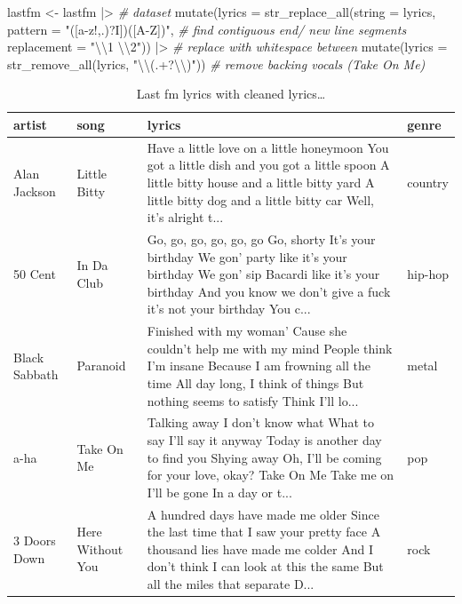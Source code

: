 \documentclass[
  letterpaper,
]{scrbook}
\newenvironment{Shaded}{\begin{snugshade}}{\end{snugshade}}
\newcommand{\AttributeTok}[1]{\textcolor[rgb]{0.00,0.00,0.00}{#1}}
\newcommand{\CommentTok}[1]{\textcolor[rgb]{0.00,0.00,0.00}{\textit{#1}}}
\newcommand{\FunctionTok}[1]{\textcolor[rgb]{0.00,0.00,0.00}{#1}}
\newcommand{\NormalTok}[1]{\textcolor[rgb]{0.00,0.00,0.00}{#1}}
\newcommand{\OtherTok}[1]{\textcolor[rgb]{0.00,0.00,0.00}{#1}}
\newcommand{\SpecialCharTok}[1]{\textcolor[rgb]{0.00,0.00,0.00}{#1}}
\newcommand{\StringTok}[1]{\textcolor[rgb]{0.00,0.00,0.00}{#1}}
\begin{document}
\begin{Shaded}
\begin{Highlighting}[]
\NormalTok{lastfm }\OtherTok{\textless{}{-}} 
\NormalTok{  lastfm }\SpecialCharTok{|\textgreater{}} \CommentTok{\# dataset}
  \FunctionTok{mutate}\NormalTok{(}\AttributeTok{lyrics =} 
           \FunctionTok{str\_replace\_all}\NormalTok{(}\AttributeTok{string =}\NormalTok{ lyrics, }
                           \AttributeTok{pattern =} \StringTok{"([a{-}z\textquotesingle{}!,.)?I])([A{-}Z])"}\NormalTok{, }\CommentTok{\# find contiguous end/ new line segments}
                           \AttributeTok{replacement =} \StringTok{"}\SpecialCharTok{\textbackslash{}\textbackslash{}}\StringTok{1 }\SpecialCharTok{\textbackslash{}\textbackslash{}}\StringTok{2"}\NormalTok{)) }\SpecialCharTok{|\textgreater{}}  \CommentTok{\# replace with whitespace between}
  \FunctionTok{mutate}\NormalTok{(}\AttributeTok{lyrics =} \FunctionTok{str\_remove\_all}\NormalTok{(lyrics, }\StringTok{"}\SpecialCharTok{\textbackslash{}\textbackslash{}}\StringTok{(.+?}\SpecialCharTok{\textbackslash{}\textbackslash{}}\StringTok{)"}\NormalTok{)) }\CommentTok{\# remove backing vocals (Take On Me)}
\end{Highlighting}
\end{Shaded}

\hypertarget{tbl-td-lastfm-clean-end-lines-preview}{}
\begin{table}
\caption{\label{tbl-td-lastfm-clean-end-lines-preview}Last fm lyrics with cleaned lyrics\ldots{} }\tabularnewline

\centering
\begin{tabular}{llll}
\toprule
artist & song & lyrics & genre\\
\midrule
Alan Jackson & Little Bitty & Have a little love on a little honeymoon You got a little dish and you got a little spoon A little bitty house and a little bitty yard A little bitty dog and a little bitty car Well, it's alright t... & country\\
50 Cent & In Da Club & Go, go, go, go, go, go Go, shorty It's your birthday We gon' party like it's your birthday We gon' sip Bacardi like it's your birthday And you know we don't give a fuck it's not your birthday You c... & hip-hop\\
Black Sabbath & Paranoid & Finished with my woman' Cause she couldn't help me with my mind People think I'm insane Because I am frowning all the time All day long, I think of things But nothing seems to satisfy Think I'll lo... & metal\\
a-ha & Take On Me & Talking away I don't know what What to say I'll say it anyway Today is another day to find you Shying away Oh, I'll be coming for your love, okay? Take On Me  Take me on  I'll be gone In a day or t... & pop\\
3 Doors Down & Here Without You & A hundred days have made me older Since the last time that I saw your pretty face A thousand lies have made me colder And I don't think I can look at this the same But all the miles that separate D... & rock\\
\bottomrule
\end{tabular}
\end{table}
\end{document}
